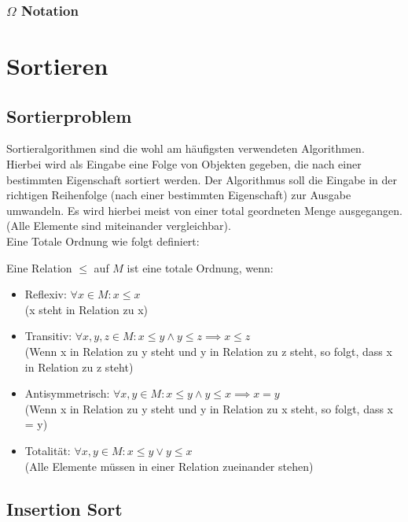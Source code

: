 \documentclass[ngerman,
color=3b,
load_common, %
boxarc,
main,
tikz,
border=3mm
]{article}
\begin{document}
\subsubsection{$\Omega$ Notation}

\newpage 
\section{Sortieren}
\subsection{Sortierproblem}
Sortieralgorithmen sind die wohl am häufigsten verwendeten Algorithmen. Hierbei wird als Eingabe eine Folge von Objekten gegeben, die nach einer bestimmten Eigenschaft sortiert werden. Der Algorithmus soll die Eingabe in der richtigen Reihenfolge (nach einer bestimmten Eigenschaft) zur Ausgabe umwandeln. Es wird hierbei meist von einer total geordneten Menge ausgegangen. (Alle Elemente sind miteinander vergleichbar). \\
Eine Totale Ordnung wie folgt definiert:
\begin{center}
    Eine Relation $\leq$ auf $M$ ist eine totale Ordnung, wenn:
    \begin{itemize}
        \item Reflexiv: $\forall x \in M: x \leq x$ \\
        (x steht in Relation zu x)
        \item Transitiv: $\forall x,y,z \in M: x \leq y \wedge y \leq z \implies x \leq z$ \\
        (Wenn x in Relation zu y steht und y in Relation zu z steht, so folgt, dass x in Relation zu z steht)
        \item Antisymmetrisch: $\forall x,y \in M: x \leq y \wedge y \leq x \implies x = y$ \\
        (Wenn x in Relation zu y steht und y in Relation zu x steht, so folgt, dass x = y)
        \item Totalität: $\forall x,y \in M: x \leq y \vee y \leq x$ \\
        (Alle Elemente müssen in einer Relation zueinander stehen)
    \end{itemize}
\end{center}
\newpage
\subsection{Insertion Sort}

\end{document}
